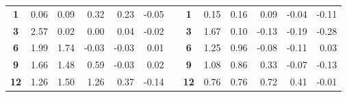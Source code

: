 \documentclass{article}
\begin{document}
\begin{table}[htbp]
\begin{tabular}{crrrrrrcrrrrr}
\cmidrule{2-6}\cmidrule{9-13}    \textbf{1} & 0.06  & 0.09  & 0.32  & 0.23  & -0.05 &       & \textbf{1} & 0.15  & 0.16  & 0.09  & -0.04 & -0.11 \\
    \textbf{3} & 2.57  & 0.02  & 0.00  & 0.04  & -0.02 &       & \textbf{3} & 1.67  & 0.10  & -0.13 & -0.19 & -0.28 \\
    \textbf{6} & 1.99  & 1.74  & -0.03 & -0.03 & 0.01  &       & \textbf{6} & 1.25  & 0.96  & -0.08 & -0.11 & 0.03 \\
    \textbf{9} & 1.66  & 1.48  & 0.59  & -0.03 & 0.02  &       & \textbf{9} & 1.08  & 0.86  & 0.33  & -0.07 & -0.13 \\
    \textbf{12} & 1.26  & 1.50  & 1.26  & 0.37  & -0.14 &       & \textbf{12} & 0.76  & 0.76  & 0.72  & 0.41  & -0.01 \\
    \bottomrule
    \end{tabular}%
  \label{tab:addlabel}%
\end{table}%
\end{document}
